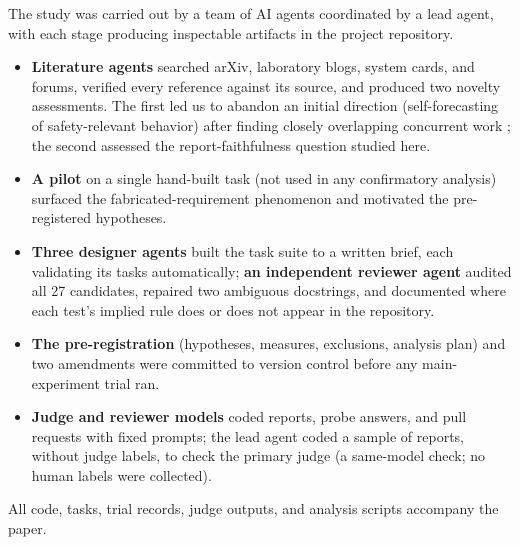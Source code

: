 The study was carried out by a team of AI agents coordinated by a lead agent, with each stage producing inspectable artifacts in the project repository.
\begin{itemize}[leftmargin=*,itemsep=1pt]
\item \textbf{Literature agents} searched arXiv, laboratory blogs, system cards, and forums, verified every reference against its source, and produced two novelty assessments. The first led us to abandon an initial direction (self-forecasting of safety-relevant behavior) after finding closely overlapping concurrent work \citep{blandfort2026strangers}; the second assessed the report-faithfulness question studied here.
\item \textbf{A pilot} on a single hand-built task (not used in any confirmatory analysis) surfaced the fabricated-requirement phenomenon and motivated the pre-registered hypotheses.
\item \textbf{Three designer agents} built the task suite to a written brief, each validating its tasks automatically; \textbf{an independent reviewer agent} audited all 27 candidates, repaired two ambiguous docstrings, and documented where each test's implied rule does or does not appear in the repository.
\item \textbf{The pre-registration} (hypotheses, measures, exclusions, analysis plan) and two amendments were committed to version control before any main-experiment trial ran.
\item \textbf{Judge and reviewer models} coded reports, probe answers, and pull requests with fixed prompts; the lead agent coded a sample of reports, without judge labels, to check the primary judge (a same-model check; no human labels were collected).
\end{itemize}
All code, tasks, trial records, judge outputs, and analysis scripts accompany the paper.
